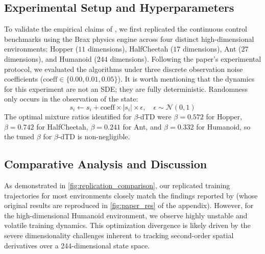 \documentclass{article}
\begin{document}
\subsection{Experimental Setup and Hyperparameters}
To validate the empirical claims of \citet{settai2025}, we first replicated the continuous control benchmarks using the Brax physics engine across four distinct high-dimensional environments: Hopper ($11$ dimensions), HalfCheetah ($17$ dimensions), Ant ($27$ dimensions), and Humanoid ($244$ dimensions). Following the paper's experimental protocol, we evaluated the algorithms under three discrete observation noise coefficients ($\text{coeff} \in \{0.00, 0.01, 0.05\}$). It is worth mentioning that the dynamics for this experiment are not an SDE; they are fully deterministic. Randomness only occurs in the observation of the state:
\begin{equation}
    s_i \leftarrow s_i + \text{coeff} \times |s_i| \times \epsilon, \quad \epsilon \sim \mathcal{N}(0, 1)
\end{equation}
The optimal mixture ratios identified for $\beta$-dTD were $\beta = 0.572$ for Hopper, $\beta = 0.742$ for HalfCheetah, $\beta = 0.241$ for Ant, and $\beta = 0.332$ for Humanoid, so the tuned $\beta$ for $\beta$-dTD is non-negligible.

\subsection{Comparative Analysis and Discussion}
As demonstrated in \cref{fig:replication_comparison}, our replicated training trajectories for most environments closely match the findings reported by \citet{settai2025} (whose original results are reproduced in \cref{fig:paper_res} of the appendix). However, for the high-dimensional Humanoid environment, we observe highly unstable and volatile training dynamics. This optimization divergence is likely driven by the severe dimensionality challenges inherent to tracking second-order spatial derivatives over a 244-dimensional state space.
\end{document}
